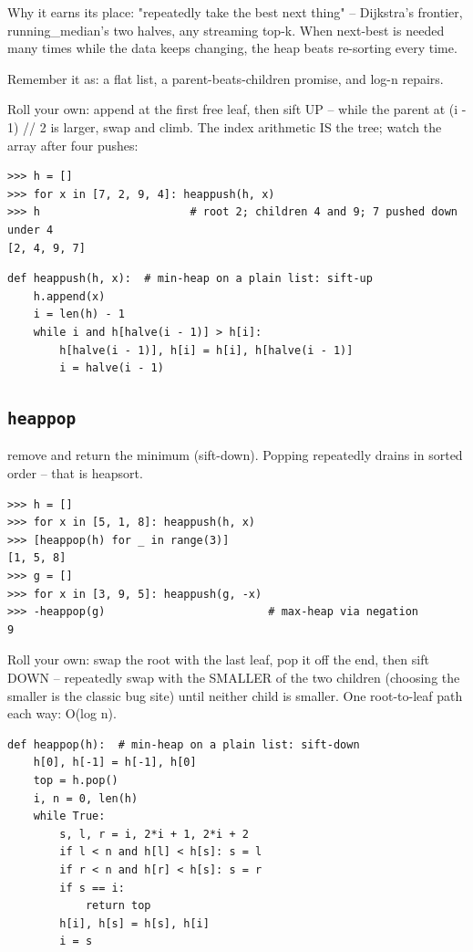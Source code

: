 \documentclass[10pt,letterpaper]{book}
\begin{document}
Why it earns its place: "repeatedly take the best next thing" -- Dijkstra's frontier, running\_median's two halves, any streaming top-k. When next-best is needed many times while the data keeps changing, the heap beats re-sorting every time.


Remember it as: a flat list, a parent-beats-children promise, and log-n repairs.


Roll your own: append at the first free leaf, then sift UP -- while the parent at (i - 1) // 2 is larger, swap and climb. The index arithmetic IS the tree; watch the array after four pushes:

\begin{lstlisting}[style=ex]
>>> h = []
>>> for x in [7, 2, 9, 4]: heappush(h, x)
>>> h                       # root 2; children 4 and 9; 7 pushed down under 4
[2, 4, 9, 7]
\end{lstlisting}
\begin{lstlisting}[style=ex]
def heappush(h, x):  # min-heap on a plain list: sift-up
    h.append(x)
    i = len(h) - 1
    while i and h[halve(i - 1)] > h[i]:
        h[halve(i - 1)], h[i] = h[i], h[halve(i - 1)]
        i = halve(i - 1)
\end{lstlisting}

\subsection{\texttt{heappop}}\label{def:heappop}
remove and return the minimum (sift-down). Popping repeatedly drains in sorted order -- that is heapsort.
\begin{lstlisting}[style=ex]
>>> h = []
>>> for x in [5, 1, 8]: heappush(h, x)
>>> [heappop(h) for _ in range(3)]
[1, 5, 8]
>>> g = []
>>> for x in [3, 9, 5]: heappush(g, -x)
>>> -heappop(g)                         # max-heap via negation
9
\end{lstlisting}

Roll your own: swap the root with the last leaf, pop it off the end, then sift DOWN -- repeatedly swap with the SMALLER of the two children (choosing the smaller is the classic bug site) until neither child is smaller. One root-to-leaf path each way: O(log n).

\begin{lstlisting}[style=ex]
def heappop(h):  # min-heap on a plain list: sift-down
    h[0], h[-1] = h[-1], h[0]
    top = h.pop()
    i, n = 0, len(h)
    while True:
        s, l, r = i, 2*i + 1, 2*i + 2
        if l < n and h[l] < h[s]: s = l
        if r < n and h[r] < h[s]: s = r
        if s == i:
            return top
        h[i], h[s] = h[s], h[i]
        i = s
\end{lstlisting}
\end{document}

